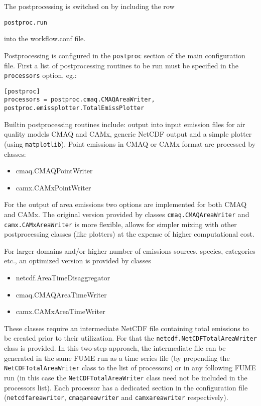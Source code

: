 \documentclass[a4paper,11pt]{article}
\begin{document}
The postprocessing is switched on by including the row
\begin{verbatim}
postproc.run 
\end{verbatim}
into the workflow.conf file.

Postprocessing is configured in the \texttt{postproc} section of the
main configuration file. First a list of postprocessing routines to be
run must be specified in the \texttt{processors} option, eg.:

\begin{verbatim}
[postproc]
processors = postproc.cmaq.CMAQAreaWriter,
postproc.emissplotter.TotalEmissPlotter
\end{verbatim}

Builtin postprocessing routines include: output into input emission
files for air quality models CMAQ and CAMx, generic NetCDF output and a
simple plotter (using \texttt{matplotlib}). Point emissions in CMAQ or
CAMx format are processed by classes:

\begin{itemize}
\item
  cmaq.CMAQPointWriter
\item
  camx.CAMxPointWriter
\end{itemize}

For the output of area emissions two options are implemented for both
CMAQ and CAMx. The original version provided by classes
\texttt{cmaq.CMAQAreaWriter} and \texttt{camx.CAMxAreaWriter} is more
flexible, allows for simpler mixing with other postprocessing classes
(like plotters) at the expense of higher computational cost.

For larger domains and/or higher number of emissions sources, species,
categories etc., an optimized version is provided by classes

\begin{itemize}
\item
  netcdf.AreaTimeDisaggregator
\item
  cmaq.CMAQAreaTimeWriter
\item
  camx.CAMxAreaTimeWriter
\end{itemize}

These classes require an intermediate NetCDF file containing total
emissions to be created prior to their utilization. For that the
\texttt{netcdf.NetCDFTotalAreaWriter} class is provided. In this
two-step approach, the intermediate file can be generated in the same
FUME run as a time series file (by prepending the
\texttt{NetCDFTotalAreaWriter} class to the list of processors) or in
any following FUME run (in this case the \texttt{NetCDFTotalAreaWriter}
class need not be included in the processors list). Each processor has a
dedicated section in the configuration file (\texttt{netcdfareawriter},
\texttt{cmaqareawriter} and \texttt{camxareawriter} respectively).
\end{document}
